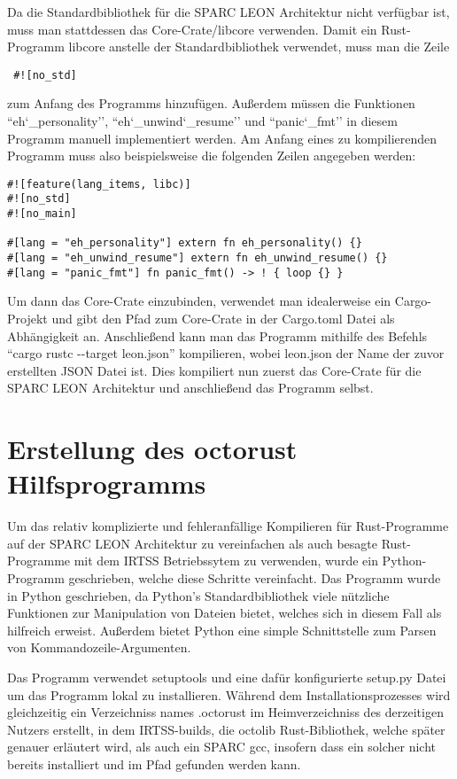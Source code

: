 Da die Standardbibliothek für die SPARC LEON Architektur nicht verfügbar ist, muss man stattdessen das Core-Crate/libcore verwenden.
Damit ein Rust-Programm libcore anstelle der Standardbibliothek verwendet, 
muss man die Zeile 
\begin{verbatim} #![no_std] \end{verbatim}
zum Anfang des Programms hinzufügen. Außerdem müssen die Funktionen ``eh\char`_personality'', ``eh\char`_unwind\char`_resume'' und
``panic\char`_fmt'' in diesem Programm manuell implementiert werden.
Am Anfang eines zu kompilierenden Programm muss also beispielsweise die folgenden
Zeilen angegeben werden:
\begin{verbatim}
#![feature(lang_items, libc)]
#![no_std]
#![no_main]

#[lang = "eh_personality"] extern fn eh_personality() {}
#[lang = "eh_unwind_resume"] extern fn eh_unwind_resume() {}
#[lang = "panic_fmt"] fn panic_fmt() -> ! { loop {} }
\end{verbatim}

Um dann das Core-Crate einzubinden, verwendet man idealerweise ein Cargo-Projekt und gibt den
Pfad zum Core-Crate in der Cargo.toml Datei als Abhängigkeit an. Anschließend kann man das Programm mithilfe des
Befehls ``cargo rustc -{}-target leon.json'' kompilieren, wobei leon.json der Name der zuvor erstellten JSON Datei ist.
Dies kompiliert nun zuerst das Core-Crate für die SPARC LEON Architektur und anschließend das Programm selbst.

\section{Erstellung des octorust Hilfsprogramms}

Um das relativ komplizierte und fehleranfällige Kompilieren für Rust-Programme auf der SPARC LEON Architektur zu vereinfachen als
auch besagte Rust-Programme mit dem IRTSS Betriebssytem zu verwenden, wurde ein Python-Programm geschrieben, welche diese Schritte
vereinfacht. Das Programm wurde in Python geschrieben, da Python's Standardbibliothek viele nützliche Funktionen zur Manipulation
von Dateien bietet, welches sich in diesem Fall als hilfreich erweist. Außerdem bietet Python eine simple Schnittstelle zum Parsen
von Kommandozeile-Argumenten.

Das Programm verwendet setuptools und eine dafür konfigurierte setup.py Datei um das Programm lokal zu installieren. Während dem
Installationsprozesses wird gleichzeitig ein Verzeichniss names .octorust im Heimverzeichniss des derzeitigen Nutzers erstellt,
in dem IRTSS-builds, die octolib Rust-Bibliothek, welche später genauer erläutert wird, als auch ein SPARC gcc, insofern dass ein
solcher nicht bereits installiert und im Pfad gefunden werden kann.

